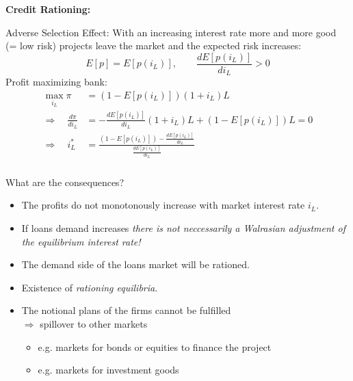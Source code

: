 \documentclass[11pt]{beamer}
\begin{document}

\begin{frame}
\frametitle{\insertsection}

\textbf{Credit Rationing:}
\par\medskip

Adverse Selection Effect: With an increasing interest rate more and more good (= low risk) projects leave the market and the expected risk increases:
$$
E[p]=E[p(i_L)],\qquad \frac{dE[p(i_L)]}{di_L}>0
$$
Profit maximizing bank:
\begin{align}
\max_{i_L} \pi &= (1-E[p(i_L)])(1+i_L)L\\
\Rightarrow\quad
\frac{d\pi}{di_L} &= -\frac{dE[p(i_L)]}{di_L}(1+i_L)L+(1-E[p(i_L)])L=0\\
\Rightarrow\quad
i_L^* &= \frac{(1-E[p(i_L)])-\frac{dE[p(i_L)]}{di_L}}{\frac{dE[p(i_L)]}{di_L}}
\end{align}
\end{frame}


\begin{frame}
\frametitle{\insertsection}

What are the consequences?

\begin{itemize}
\item The profits do not monotonously increase with market interest rate $i_L$.

\item If loans demand increases \textit{there is not neccessarily a Walrasian adjustment of the equilibrium interest rate! }

\item The demand side of the loans market will be rationed.

\item Existence of \textit{rationing equilibria}.

\item The notional plans of the firms cannot be fulfilled \\
$\Rightarrow$ spillover to other markets
\begin{itemize}
\item  e.g. markets for bonds or equities to finance the project
\item  e.g. markets for investment goods
\end{itemize}

\end{itemize}

\end{frame}
\end{document}
